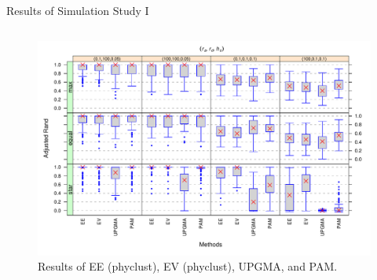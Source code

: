 \documentclass{beamer}
\begin{document}
\begin{frame}{Results of Simulation Study I}

\vspace{-0.8cm}
\begin{columns}

\hspace{-1.2cm}
\begin{column}{\textwidth}
\begin{figure}
  \includegraphics[width=4.7in]{./graph/simulation_a_sub}
  \\
  \vspace{-0.2cm}
  {\tiny Results of EE (phyclust), EV (phyclust), UPGMA, and PAM.}
\end{figure}
\end{column}

\end{columns}

\end{frame}

\end{document}
